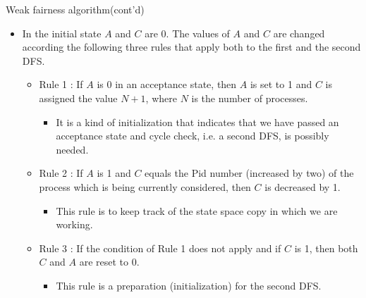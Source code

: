 \documentclass[12pt]{beamer}
\begin{document}
\begin{frame}{Weak fairness algorithm(cont'd)}
	\begin{itemize}
		\item In the initial state $A$ and $C$ are 0. The values of $A$ and $C$ are changed according the following three rules that apply both to the first and the second DFS.
		\begin{itemize}
			\item Rule 1 : If $A$ is 0 in an acceptance state, then $A$ is set to 1 and $C$ is assigned the value $N+1$, where $N$ is the number of processes.
				\begin{itemize}
					\item It is a kind of initialization that indicates that we have passed an acceptance state and cycle check, i.e. a second DFS, is possibly needed.
				\end{itemize}
			\item Rule 2 : If $A$ is 1 and $C$ equals the Pid number (increased by two) of the process which is being currently considered, then $C$ is decreased by 1.
				\begin{itemize}
					\item This rule is to keep track of the state space copy in which we are working.
				\end{itemize}
			\item Rule 3 : If the condition of Rule 1 does not apply and if $C$ is 1, then both $C$ and $A$ are reset to 0.
				\begin{itemize}
					\item This rule is a preparation (initialization) for the second DFS.
				\end{itemize}
		\end{itemize}
	\end{itemize}
\end{frame}
\end{document}
